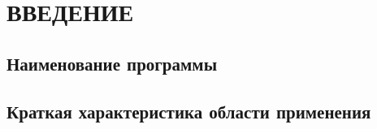 \section{ВВЕДЕНИЕ}

\noindent\subsection{Наименование программы}
    \docTitle

\noindent\subsection{Краткая характеристика области применения}


\clearpage
